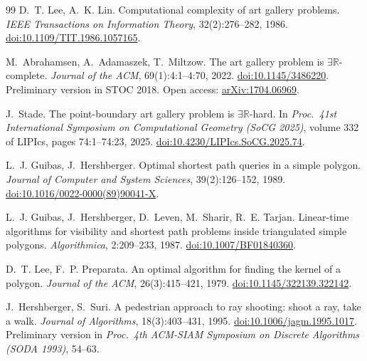 \documentclass[11pt,a4paper]{article}
\theoremstyle{definition}
\theoremstyle{remark}
\begin{document}
\begin{thebibliography}{99}
D.~T. Lee, A.~K. Lin.
\newblock Computational complexity of art gallery problems.
\newblock \emph{IEEE Transactions on Information Theory}, 32(2):276--282, 1986.
\newblock \href{https://doi.org/10.1109/TIT.1986.1057165}{doi:10.1109/TIT.1986.1057165}.

M.~Abrahamsen, A.~Adamaszek, T.~Miltzow.
\newblock The art gallery problem is $\exists\mathbb{R}$-complete.
\newblock \emph{Journal of the ACM}, 69(1):4:1--4:70, 2022.
\newblock \href{https://doi.org/10.1145/3486220}{doi:10.1145/3486220}.
\newblock Preliminary version in STOC 2018. Open access: \href{https://arxiv.org/abs/1704.06969}{arXiv:1704.06969}.

J.~Stade.
\newblock The point-boundary art gallery problem is $\exists\mathbb{R}$-hard.
\newblock In \emph{Proc.\ 41st International Symposium on Computational Geometry (SoCG 2025)}, volume 332 of LIPIcs, pages 74:1--74:23, 2025.
\newblock \href{https://doi.org/10.4230/LIPIcs.SoCG.2025.74}{doi:10.4230/LIPIcs.SoCG.2025.74}.

L.~J. Guibas, J.~Hershberger.
\newblock Optimal shortest path queries in a simple polygon.
\newblock \emph{Journal of Computer and System Sciences}, 39(2):126--152, 1989.
\newblock \href{https://doi.org/10.1016/0022-0000(89)90041-X}{doi:10.1016/0022-0000(89)90041-X}.

L.~J. Guibas, J.~Hershberger, D.~Leven, M.~Sharir, R.~E. Tarjan.
\newblock Linear-time algorithms for visibility and shortest path problems inside triangulated simple polygons.
\newblock \emph{Algorithmica}, 2:209--233, 1987.
\newblock \href{https://doi.org/10.1007/BF01840360}{doi:10.1007/BF01840360}.

D.~T. Lee, F.~P. Preparata.
\newblock An optimal algorithm for finding the kernel of a polygon.
\newblock \emph{Journal of the ACM}, 26(3):415--421, 1979.
\newblock \href{https://doi.org/10.1145/322139.322142}{doi:10.1145/322139.322142}.

J.~Hershberger, S.~Suri.
\newblock A pedestrian approach to ray shooting: shoot a ray, take a walk.
\newblock \emph{Journal of Algorithms}, 18(3):403--431, 1995.
\newblock \href{https://doi.org/10.1006/jagm.1995.1017}{doi:10.1006/jagm.1995.1017}.
\newblock Preliminary version in \emph{Proc.\ 4th ACM-SIAM Symposium on Discrete Algorithms (SODA 1993)}, 54--63.

\end{thebibliography}
\end{document}
